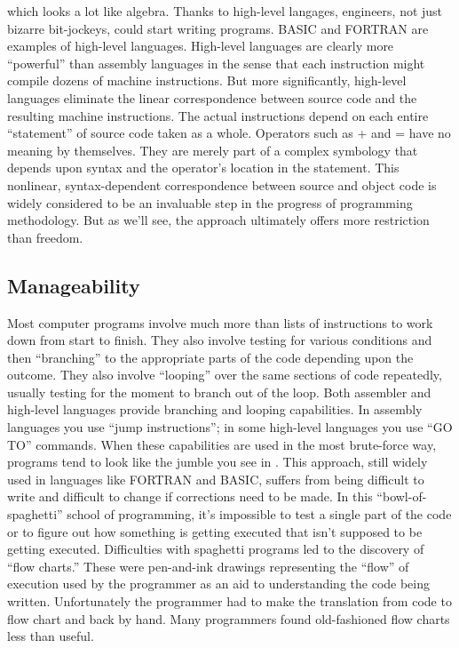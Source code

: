 which looks a lot like algebra. Thanks to high-level langages, engineers,
not just bizarre bit-jockeys, could start writing programs. BASIC
and FORTRAN are examples of high-level languages. High-level languages
are clearly more {}``powerful'' than assembly languages in the sense
that each instruction might compile dozens of machine instructions.
But more significantly, high-level languages eliminate the linear
correspondence between source code and the resulting machine instructions.
The actual instructions depend on each entire {}``statement'' of
source code taken as a whole. Operators such as + and = have no meaning
by themselves. They are merely part of a complex symbology that depends
upon syntax and the operator's location in the statement. This nonlinear,
syntax-dependent correspondence between source and object code is
widely considered to be an invaluable step in the progress of programming
methodology. But as we'll see, the approach ultimately offers more
restriction than freedom.


\subsection{Manageability}

Most computer programs involve much more than lists of instructions
to work down from start to finish. They also involve testing for various
conditions and then {}``branching'' to the appropriate parts of the
code depending upon the outcome. They also involve {}``looping''
over the same sections of code repeatedly, usually testing for the
moment to branch out of the loop. Both assembler and high-level languages
provide branching and looping capabilities. In assembly languages
you use {}``jump instructions''; in some high-level languages you
use {}``GO TO'' commands. When these capabilities are used in the
most brute-force way, programs tend to look like the jumble you see
in . This approach, still widely used in languages like
FORTRAN and BASIC, suffers from being difficult to write and difficult
to change if corrections need to be made. In this {}``bowl-of-spaghetti''
school of programming, it's impossible to test a single part of the
code or to figure out how something is getting executed that isn't
supposed to be getting executed. Difficulties with spaghetti programs
led to the discovery of {}``flow charts.'' These were pen-and-ink
drawings representing the {}``flow'' of execution used by the programmer
as an aid to understanding the code being written. Unfortunately the
programmer had to make the translation from code to flow chart and
back by hand. Many programmers found old-fashioned flow charts less
than useful.


